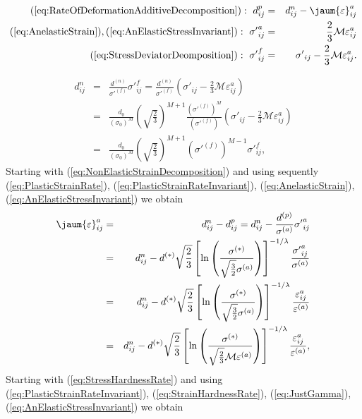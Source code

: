 \begin{eqnarray}
(\ref{eq:RateOfDeformationAdditiveDecomposition}): ~d^{p}_{ij}&=&d^{n}_{ij}-\jaum{\varepsilon}^{a}_{ij} \\
(\ref{eq:AnelasticStrain}),(\ref{eq:AnElasticStressInvariant}):~ \sigma{'}^{a}_{ij}&=&\frac{2}{3} \mathcal{M}\varepsilon^{a}_{ij} \\
(\ref{eq:StressDeviatorDeomposition}):~ \sigma{'}^{f}_{ij}&=&\sigma{'}_{ij}- \frac{2}{3}  \mathcal{M} \varepsilon^{a}_{ij}.
\end{eqnarray}

\begin{eqnarray}
d^{n}_{ij}&=&\frac{d^{(n)}}{\sigma{'}^{(f)}}\sigma{'}^{f}_{ij}=\frac{d^{(n)}}{\sigma{'}^{(f)}}\left(\sigma{'}_{ij}-\frac{2}{3}  \mathcal{M} \varepsilon^{a}_{ij}\right) \nonumber \\
&=& \frac{d_0}{(\sigma_0)^{\mathit{M}}}\left(\sqrt{\frac{2}{3}} \right)^{\mathit{M}+1}\frac{(\sigma{'}^{(f)})^{\mathit{M}}}{(\sigma{'}^{(f)})}\left(\sigma{'}_{ij}-\frac{2}{3}  \mathcal{M} \varepsilon^{a}_{ij}\right) \nonumber \\
&=&\frac{d_0}{(\sigma_0)^{\mathit{M}}}\left(\sqrt{\frac{2}{3}} \right)^{\mathit{M}+1} (\sigma{'}^{(f)})^{\mathit{M}-1}\sigma{'}^{f}_{ij},
\end{eqnarray}
Starting with  (\ref{eq:NonElasticStrainDecomposition}) and using  sequently (\ref{eq:PlasticStrainRate}), (\ref{eq:PlasticStrainRateInvariant}), (\ref{eq:AnelasticStrain}), (\ref{eq:AnElasticStressInvariant}) we obtain
\begin{eqnarray}\label{eq:AnelasticJaumDerivative}
\jaum{\varepsilon}^{a}_{ij}&=&d^{n}_{ij}-d^{p}_{ij}=d^{n}_{ij}-\frac{d^{(p)}}{\sigma^{(a)}}\sigma{'}^{a}_{ij} \nonumber \\
&=&d^{n}_{ij}- d^{(*)} \sqrt{\frac{2}{3}}\left[ \ln \left(\frac{\sigma^{(*)}}{\sqrt{\frac{3}{2}}\sigma^{(a)}} \right)\right]^{-1/\lambda} \frac{\sigma{'}^{a}_{ij}}{\sigma^{(a)}} \nonumber\\
&=&d^{n}_{ij}- d^{(*)}\sqrt{\frac{2}{3}} \left[ \ln \left(\frac{\sigma^{(*)}}{\sqrt{\frac{3}{2}}\sigma^{(a)}} \right)\right]^{-1/\lambda} \frac{\varepsilon^{a}_{ij}}{\varepsilon^{(a)}}\nonumber\\
&=&d^{n}_{ij}- d^{(*)}\sqrt{\frac{2}{3}} \left[ \ln \left(\frac{\sigma^{(*)}}{\sqrt{\frac{2}{3}}\mathcal{M}\varepsilon^{(a)}} \right)\right]^{-1/\lambda} \frac{\varepsilon^{a}_{ij}}{\varepsilon^{(a)}},
\end{eqnarray}
Starting with  (\ref{eq:StressHardnessRate}) and using (\ref{eq:PlasticStrainRateInvariant}), (\ref{eq:StrainHardnessRate}), (\ref{eq:JustGamma}), (\ref{eq:AnElasticStressInvariant}) we obtain

